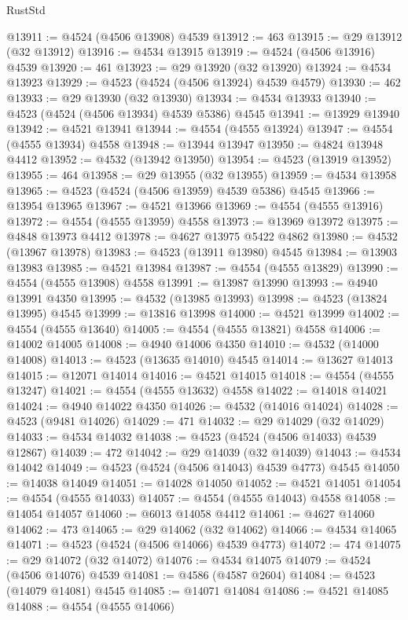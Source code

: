 \begin{lexlean}{RustStd}
\begin{coremodule}
@13911 := @4524 (@4506 @13908) @4539
@13912 := 463
@13915 := @29 @13912 (@32 @13912)
@13916 := @4534 @13915
@13919 := @4524 (@4506 @13916) @4539
@13920 := 461
@13923 := @29 @13920 (@32 @13920)
@13924 := @4534 @13923
@13929 := @4523 (@4524 (@4506 @13924) @4539 @4579)
@13930 := 462
@13933 := @29 @13930 (@32 @13930)
@13934 := @4534 @13933
@13940 := @4523 (@4524 (@4506 @13934) @4539 @5386) @4545
@13941 := @13929 @13940
@13942 := @4521 @13941
@13944 := @4554 (@4555 @13924)
@13947 := @4554 (@4555 @13934) @4558
@13948 := @13944 @13947
@13950 := @4824 @13948 @4412
@13952 := @4532 (@13942 @13950)
@13954 := @4523 (@13919 @13952)
@13955 := 464
@13958 := @29 @13955 (@32 @13955)
@13959 := @4534 @13958
@13965 := @4523 (@4524 (@4506 @13959) @4539 @5386) @4545
@13966 := @13954 @13965
@13967 := @4521 @13966
@13969 := @4554 (@4555 @13916)
@13972 := @4554 (@4555 @13959) @4558
@13973 := @13969 @13972
@13975 := @4848 @13973 @4412
@13978 := @4627 @13975 @5422 @4862
@13980 := @4532 (@13967 @13978)
@13983 := @4523 (@13911 @13980) @4545
@13984 := @13903 @13983
@13985 := @4521 @13984
@13987 := @4554 (@4555 @13829)
@13990 := @4554 (@4555 @13908) @4558
@13991 := @13987 @13990
@13993 := @4940 @13991 @4350
@13995 := @4532 (@13985 @13993)
@13998 := @4523 (@13824 @13995) @4545
@13999 := @13816 @13998
@14000 := @4521 @13999
@14002 := @4554 (@4555 @13640)
@14005 := @4554 (@4555 @13821) @4558
@14006 := @14002 @14005
@14008 := @4940 @14006 @4350
@14010 := @4532 (@14000 @14008)
@14013 := @4523 (@13635 @14010) @4545
@14014 := @13627 @14013
@14015 := @12071 @14014
@14016 := @4521 @14015
@14018 := @4554 (@4555 @13247)
@14021 := @4554 (@4555 @13632) @4558
@14022 := @14018 @14021
@14024 := @4940 @14022 @4350
@14026 := @4532 (@14016 @14024)
@14028 := @4523 (@9481 @14026)
@14029 := 471
@14032 := @29 @14029 (@32 @14029)
@14033 := @4534 @14032
@14038 := @4523 (@4524 (@4506 @14033) @4539 @12867)
@14039 := 472
@14042 := @29 @14039 (@32 @14039)
@14043 := @4534 @14042
@14049 := @4523 (@4524 (@4506 @14043) @4539 @4773) @4545
@14050 := @14038 @14049
@14051 := @14028 @14050
@14052 := @4521 @14051
@14054 := @4554 (@4555 @14033)
@14057 := @4554 (@4555 @14043) @4558
@14058 := @14054 @14057
@14060 := @6013 @14058 @4412
@14061 := @4627 @14060
@14062 := 473
@14065 := @29 @14062 (@32 @14062)
@14066 := @4534 @14065
@14071 := @4523 (@4524 (@4506 @14066) @4539 @4773)
@14072 := 474
@14075 := @29 @14072 (@32 @14072)
@14076 := @4534 @14075
@14079 := @4524 (@4506 @14076) @4539
@14081 := @4586 (@4587 @2604)
@14084 := @4523 (@14079 @14081) @4545
@14085 := @14071 @14084
@14086 := @4521 @14085
@14088 := @4554 (@4555 @14066)

\end{coremodule}
\end{lexlean}
